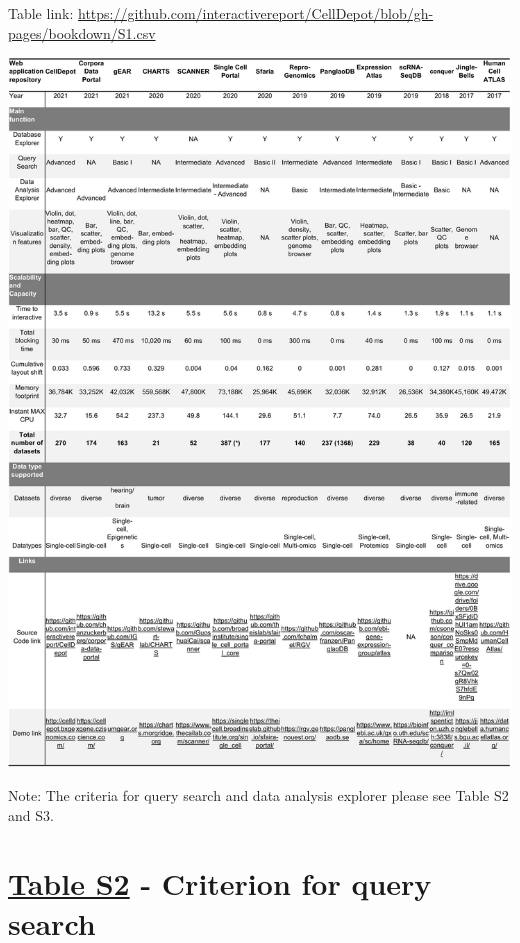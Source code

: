 \documentclass[
  openany]{book}
\begin{document}
Table link: \url{https://github.com/interactivereport/CellDepot/blob/gh-pages/bookdown/S1.csv}


\href{https://interactivereport.github.io/CellDepot/bookdown/figures/table_s1.jpg}{\includegraphics{figures/table_s1.jpg}}

Note: The criteria for query search and data analysis explorer please see Table S2 and S3.

\hypertarget{table-s2---criterion-for-query-search}{%
\section*{\texorpdfstring{\href{https://github.com/interactivereport/CellDepot/blob/gh-pages/bookdown/S2.csv}{Table S2} - Criterion for query search}{Table S2 - Criterion for query search}}\label{table-s2---criterion-for-query-search}}
\end{document}
